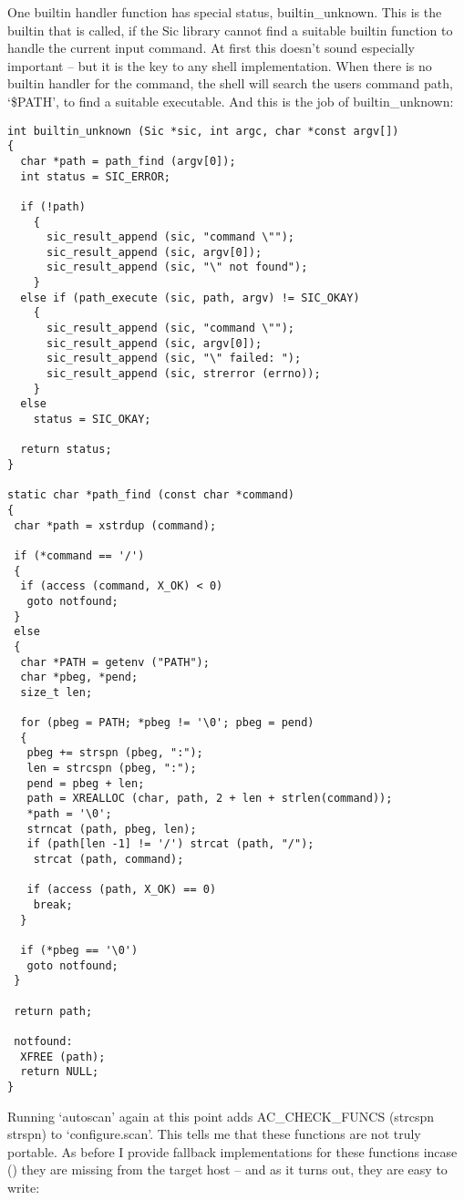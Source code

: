 One builtin handler function has special status, builtin\_{}unknown.
This is the builtin that is called, if the Sic library cannot find a 
suitable builtin function to handle the current input command. At first this 
doesn't sound especially important -- but it is the key to any shell 
implementation. When there is no builtin handler for the command, the shell 
will search the users command path, `\$PATH', to find a suitable executable.
And this is the job of builtin\_{}unknown: 

\begin{Verbatim}[frame=single]
int builtin_unknown (Sic *sic, int argc, char *const argv[])
{
  char *path = path_find (argv[0]);
  int status = SIC_ERROR;

  if (!path)
    {
      sic_result_append (sic, "command \"");
      sic_result_append (sic, argv[0]);
      sic_result_append (sic, "\" not found");
    }
  else if (path_execute (sic, path, argv) != SIC_OKAY)
    {
      sic_result_append (sic, "command \"");
      sic_result_append (sic, argv[0]);
      sic_result_append (sic, "\" failed: ");
      sic_result_append (sic, strerror (errno));
    }
  else
    status = SIC_OKAY;

  return status;
}

static char *path_find (const char *command)
{
 char *path = xstrdup (command);
  
 if (*command == '/')
 {
  if (access (command, X_OK) < 0)
   goto notfound;
 }
 else
 {
  char *PATH = getenv ("PATH");
  char *pbeg, *pend;
  size_t len;

  for (pbeg = PATH; *pbeg != '\0'; pbeg = pend)
  {
   pbeg += strspn (pbeg, ":");
   len = strcspn (pbeg, ":");
   pend = pbeg + len;
   path = XREALLOC (char, path, 2 + len + strlen(command));
   *path = '\0';
   strncat (path, pbeg, len);
   if (path[len -1] != '/') strcat (path, "/");
    strcat (path, command);
          
   if (access (path, X_OK) == 0)
    break;
  }

  if (*pbeg == '\0')
   goto notfound;
 }

 return path;

 notfound:
  XFREE (path);
  return NULL;
}  
\end{Verbatim}

Running `autoscan' again at this point adds AC\_{}CHECK\_{}FUNCS (strcspn
strspn) to `configure.scan'. This tells me that these functions are not 
truly portable. As before I provide fallback implementations for these 
functions incase ({\MeQ{}}) they are missing from the target host -- and as it 
turns out, they are easy to write: 

